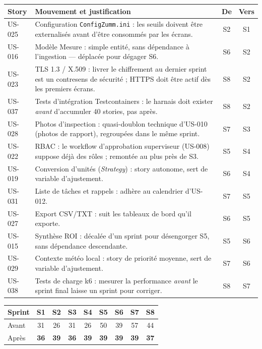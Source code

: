 \begin{center}
\small
\begin{tabular}{lp{9.2cm}cc}
\toprule
\textbf{Story} & \textbf{Mouvement et justification} & \textbf{De} & \textbf{Vers} \\
\midrule
US-025 & Configuration \texttt{ConfigZumm.ini} : les seuils doivent être
externalisés avant d'être consommés par les écrans. & S2 & S1 \\
\addlinespace
US-016 & Modèle Mesure : simple entité, sans dépendance à l'ingestion ---
déplacée pour dégager S6. & S6 & S2 \\
\addlinespace
US-023 & TLS 1.3 / X.509 : livrer le chiffrement au dernier sprint est un
contresens de sécurité ; HTTPS doit être actif dès les premiers écrans. & S8 & S2 \\
\addlinespace
US-037 & Tests d'intégration Testcontainers : le harnais doit
exister \emph{avant} d'accumuler 40 stories, pas après. & S8 & S2 \\
\addlinespace
US-028 & Photos d'inspection : quasi-doublon technique d'US-010 (photos de
rapport), regroupées dans le même sprint. & S7 & S3 \\
\addlinespace
US-022 & RBAC : le workflow d'approbation superviseur (US-008) suppose déjà
des rôles ; remontée au plus près de S3. & S5 & S4 \\
\addlinespace
US-019 & Conversion d'unités (\emph{Strategy}) : story autonome, sert de
variable d'ajustement. & S6 & S4 \\
\addlinespace
US-031 & Liste de tâches et rappels : adhère au calendrier d'US-012. & S7 & S5 \\
\addlinespace
US-027 & Export CSV/TXT : suit les tableaux de bord qu'il exporte. & S6 & S5 \\
\addlinespace
US-015 & Synthèse ROI : décalée d'un sprint pour désengorger S5, sans
dépendance descendante. & S5 & S6 \\
\addlinespace
US-029 & Contexte météo local : story de priorité moyenne, sert de
variable d'ajustement. & S7 & S6 \\
\addlinespace
US-038 & Tests de charge k6 : mesurer la performance \emph{avant} le sprint
final laisse un sprint pour corriger. & S8 & S7 \\
\bottomrule
\end{tabular}
\end{center}

\begin{center}
\begin{tabular}{lcccccccc}
\toprule
\textbf{Sprint} & S1 & S2 & S3 & S4 & S5 & S6 & S7 & S8 \\
\midrule
Avant & 31 & 26 & 31 & 26 & 50 & 39 & 57 & 44 \\
Après & \textbf{36} & \textbf{39} & \textbf{36} & \textbf{39} & \textbf{39} & \textbf{39} & \textbf{39} & \textbf{37} \\
\bottomrule
\end{tabular}
\end{center}

